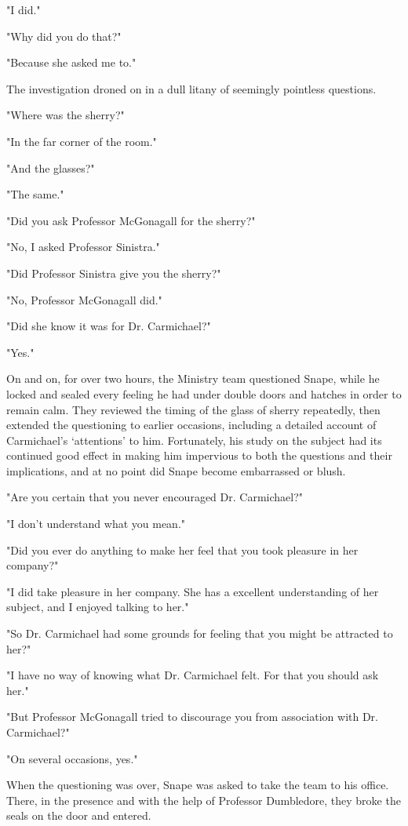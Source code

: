 "I did."

"Why did you do that?"

"Because she asked me to."

The investigation droned on in a dull litany of seemingly pointless questions.

"Where was the sherry?"

"In the far corner of the room."

"And the glasses?"

"The same."

"Did you ask Professor McGonagall for the sherry?"

"No, I asked Professor Sinistra."

"Did Professor Sinistra give you the sherry?"

"No, Professor McGonagall did."

"Did she know it was for Dr. Carmichael?"

"Yes."

On and on, for over two hours, the Ministry team questioned Snape, while he locked and sealed every feeling he had under double doors and hatches in order to remain calm. They reviewed the timing of the glass of sherry repeatedly, then extended the questioning to earlier occasions, including a detailed account of Carmichael's `attentions' to him. Fortunately, his study on the subject had its continued good effect in making him impervious to both the questions and their implications, and at no point did Snape become embarrassed or blush.

"Are you certain that you never encouraged Dr. Carmichael?"

"I don't understand what you mean."

"Did you ever do anything to make her feel that you took pleasure in her company?"

"I did take pleasure in her company. She has a excellent understanding of her subject, and I enjoyed talking to her."

"So Dr. Carmichael had some grounds for feeling that you might be attracted to her?"

"I have no way of knowing what Dr. Carmichael felt. For that you should ask her."

"But Professor McGonagall tried to discourage you from association with Dr. Carmichael?"

"On several occasions, yes."

When the questioning was over, Snape was asked to take the team to his office. There, in the presence and with the help of Professor Dumbledore, they broke the seals on the door and entered.

